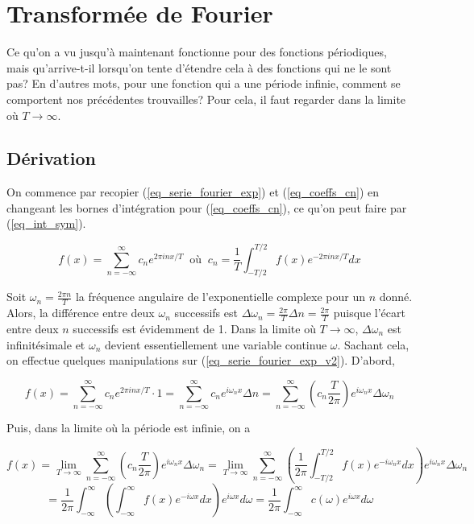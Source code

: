 \newpage
\section{Transformée de Fourier}
Ce qu'on a vu jusqu'à maintenant fonctionne pour des fonctions périodiques, mais qu'arrive-t-il lorsqu'on tente d'étendre cela à des fonctions qui ne le sont pas? En d'autres mots, pour une fonction qui a une période infinie, comment se comportent nos précédentes trouvailles? Pour cela, il faut regarder dans la limite où $T \rightarrow \infty$. 

\subsection{Dérivation}
On commence par recopier (\ref{eq_serie_fourier_exp}) et (\ref{eq_coeffs_cn}) en changeant les bornes d'intégration pour (\ref{eq_coeffs_cn}), ce qu'on peut faire par (\ref{eq_int_sym}).

\begin{equation}
    f(x) = \sum_{n = -\infty}^{\infty}c_ne^{2\pi inx/T} \ \text{ où } \ c_n = \frac{1}{T}\int_{-T/2}^{T/2}f(x)e^{-2\pi inx/T}dx
    \label{eq_serie_fourier_exp_v2}
\end{equation}

Soit $\omega_n = \frac{2\pi n}{T}$ la fréquence angulaire de l'exponentielle complexe pour un $n$ donné. Alors, la différence entre deux $\omega_n$ successifs est $\Delta \omega_n = \frac{2\pi}{T}\Delta n = \frac{2\pi}{T}$ puisque l'écart entre deux $n$ successifs est évidemment de 1. Dans la limite où $T \rightarrow \infty$, $\Delta \omega_n$ est infinitésimale et $\omega_n$ devient essentiellement une variable continue $\omega$. Sachant cela, on effectue quelques manipulations sur (\ref{eq_serie_fourier_exp_v2}). D'abord,

\begin{equation*}
    f(x) = \sum_{n = -\infty}^{\infty}c_ne^{2\pi inx/T} \cdot 1 = \sum_{n = -\infty}^{\infty}c_ne^{i\omega_nx} \Delta n = \sum_{n = -\infty}^{\infty}\left(c_n\frac{T}{2\pi}\right)e^{i\omega_nx}\Delta \omega_n  
\end{equation*}

Puis, dans la limite où la période est infinie, on a 

\begin{equation*}
    f(x) = \lim_{T\rightarrow\infty}\sum_{n = -\infty}^{\infty}\left(c_n\frac{T}{2\pi}\right)e^{i\omega_nx}\Delta \omega_n = \lim_{T\rightarrow\infty}\sum_{n = -\infty}^{\infty}\left(\frac{1}{2\pi}\int_{-T/2}^{T/2}f(x)e^{-i\omega_nx}dx\right) e^{i\omega_nx}\Delta \omega_n
\end{equation*}
\begin{equation}
    = \frac{1}{2\pi}\int_{-\infty}^{\infty}\left(\int_{-\infty}^{\infty}f(x)e^{-i\omega x}dx\right)e^{i\omega x}d\omega = \frac{1}{2\pi}\int_{-\infty}^{\infty}c(\omega)e^{i\omega x}d\omega 
    \label{eq_TFI}
\end{equation}

